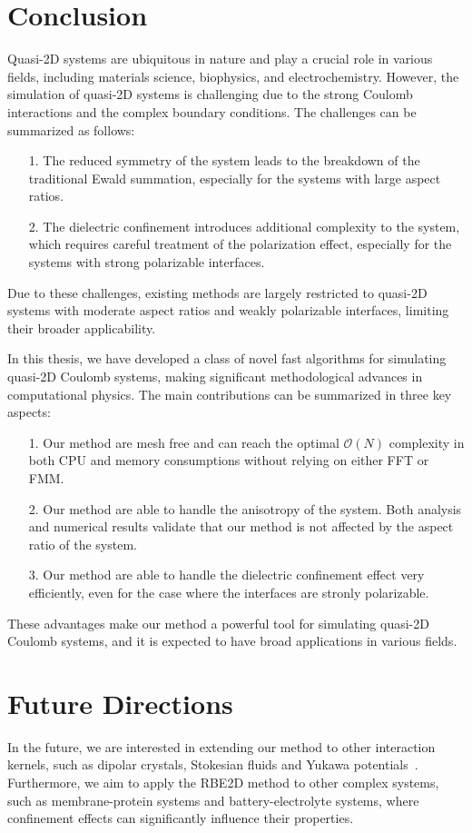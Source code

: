 \section{Conclusion}

Quasi-2D systems are ubiquitous in nature and play a crucial role in various fields, including materials science, biophysics, and electrochemistry. 
However, the simulation of quasi-2D systems is challenging due to the strong Coulomb interactions and the complex boundary conditions.
The challenges can be summarized as follows:
\begin{itemize}
    \item[1.] The reduced symmetry of the system leads to the breakdown of the traditional Ewald summation, especially for the systems with large aspect ratios.
    \item[2.] The dielectric confinement introduces additional complexity to the system, which requires careful treatment of the polarization effect, especially for the systems with strong polarizable interfaces.
\end{itemize}
Due to these challenges, existing methods are largely restricted to quasi-2D systems with moderate aspect ratios and weakly polarizable interfaces, limiting their broader applicability.

In this thesis, we have developed a class of novel fast algorithms for simulating quasi-2D Coulomb systems, making significant methodological advances in computational physics. 
The main contributions can be summarized in three key aspects:
\begin{itemize}
    \item[1.] Our method are mesh free and can reach the optimal $\mathcal{O}(N)$ complexity in both CPU and memory consumptions without relying on either FFT or FMM.
    \item[2.] Our method are able to handle the anisotropy of the system. Both analysis and numerical results validate that our method is not affected by the aspect ratio of the system.
    \item[3.] Our method are able to handle the dielectric confinement effect very efficiently, even for the case where the interfaces are stronly polarizable.
\end{itemize}
These advantages make our method a powerful tool for simulating quasi-2D Coulomb systems, and it is expected to have broad applications in various fields.


\section{Future Directions}

In the future, we are interested in extending our method to other interaction kernels, such as dipolar crystals, Stokesian fluids and Yukawa potentials~\cite{Messina2017PRL,Hou2009PRL}.
Furthermore, we aim to apply the RBE2D method to other complex systems, such as membrane-protein systems and battery-electrolyte systems, where confinement effects can significantly influence their properties.